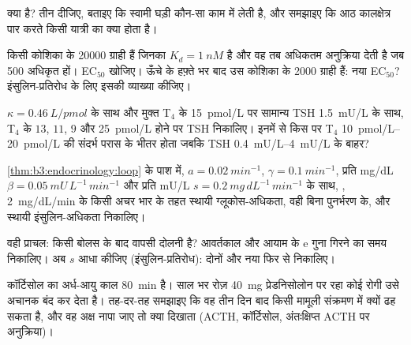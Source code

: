 \begin{exercise}[$\star$]\label{exo:b3:endocrinology:4}
 क्या है? तीन दीजिए, बताइए कि स्वामी घड़ी कौन-सा काम में लेती
है, और समझाइए कि आठ कालक्षेत्र पार करते किसी यात्री का क्या होता है।
\end{exercise}

\begin{exercise}[$\star\star$]\label{exo:b3:endocrinology:5}
किसी कोशिका के \num{20000} ग्राही हैं जिनका $K_{d} = \qty{1}{nM}$ है और
वह तब अधिकतम अनुक्रिया देती है जब \num{500} अधिकृत हों। EC$_{50}$
खोजिए। ऊँचे  के हफ़्ते भर बाद उस कोशिका के \num{2000} ग्राही
हैं: नया EC$_{50}$? इंसुलिन-प्रतिरोध के लिए इसकी व्याख्या कीजिए।
\end{exercise}

\begin{exercise}[$\star\star$]\label{exo:b3:endocrinology:6}
$\kappa = \qty{0.46}{L/pmol}$ के साथ और मुक्त T$_{4}$ के
\qty{15}{pmol/L} पर सामान्य TSH \qty{1.5}{mU/L} के साथ, T$_{4}$ के
$13$, $11$, $9$ और \qty{25}{pmol/L} होने पर TSH निकालिए। इनमें से किस
पर T$_{4}$ \qtyrange{10}{20}{pmol/L} की संदर्भ परास के भीतर होता जबकि
TSH \qtyrange{0.4}{4}{mU/L} के बाहर?
\end{exercise}

\begin{exercise}[$\star\star$]\label{exo:b3:endocrinology:7}
\cref{thm:b3:endocrinology:loop} के पाश में, $a = \qty{0.02}{min^{-1}}$,
$\gamma = \qty{0.1}{min^{-1}}$, प्रति mg/dL
$\beta = \qty{0.05}{mU\,L^{-1}\,min^{-1}}$
और प्रति mU/L $s = \qty{0.2}{mg\,dL^{-1}\,min^{-1}}$ के साथ, ,
\qty{2}{mg/dL/min} के किसी अचर भार के तहत स्थायी ग्लूकोस-अधिकता, वही
बिना पुनर्भरण के, और स्थायी इंसुलिन-अधिकता निकालिए।
\end{exercise}

\begin{exercise}[$\star\star$]\label{exo:b3:endocrinology:8}
वही प्राचल: किसी बोलस के बाद वापसी दोलनी है? आवर्तकाल और आयाम के
$\mathrm{e}$ गुना गिरने का समय निकालिए। अब $s$ आधा कीजिए
(इंसुलिन-प्रतिरोध): दोनों और नया  फिर से निकालिए।
\end{exercise}

\begin{exercise}[$\star\star$]\label{exo:b3:endocrinology:9}
कॉर्टिसोल का अर्ध-आयु काल \qty{80}{min} है। साल भर रोज़
\qty{40}{mg} प्रेडनिसोलोन पर रहा कोई रोगी उसे अचानक बंद कर देता है।
तह-दर-तह समझाइए कि वह तीन दिन बाद किसी मामूली संक्रमण में क्यों ढह
सकता है, और वह अक्ष नापा जाए तो क्या दिखाता (ACTH, कॉर्टिसोल,
अंतःक्षिप्त ACTH पर अनुक्रिया)।
\end{exercise}

